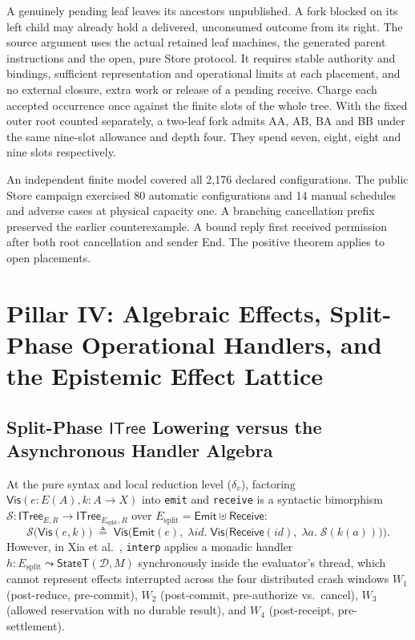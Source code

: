 \documentclass[11pt,a4paper]{article}
\theoremstyle{definition}
\theoremstyle{remark}
\newcommand{\ITree}{\mathsf{ITree}}
\begin{document}
A genuinely pending leaf leaves its ancestors unpublished. A fork blocked on its left child may already hold a delivered, unconsumed outcome from its right. The source argument uses the actual retained leaf machines, the generated parent instructions and the open, pure Store protocol. It requires stable authority and bindings, sufficient representation and operational limits at each placement, and no external closure, extra work or release of a pending receive. Charge each accepted occurrence once against the finite slots of the whole tree. With the fixed outer root counted separately, a two-leaf fork admits AA, AB, BA and BB under the same nine-slot allowance and depth four. They spend seven, eight, eight and nine slots respectively.

An independent finite model covered all 2,176 declared configurations. The public Store campaign exercised 80 automatic configurations and 14 manual schedules and adverse cases at physical capacity one. A branching cancellation prefix preserved the earlier counterexample. A bound reply first received permission after both root cancellation and sender End. The positive theorem applies to open placements.

\section{Pillar IV: Algebraic Effects, Split-Phase Operational Handlers, and the Epistemic Effect Lattice}

\subsection{Split-Phase \texorpdfstring{$\ITree$}{ITree} Lowering versus the Asynchronous Handler Algebra}
At the pure syntax and local reduction level ($\delta_v$), factoring $\mathsf{Vis}(e : E(A), k : A \to X)$ into \texttt{emit} and \texttt{receive} is a syntactic bimorphism $\mathcal{S} : \ITree_{E,R} \to \ITree_{E_{\text{split}}, R}$ over $E_{\text{split}} = \mathsf{Emit} \uplus \mathsf{Receive}$:
\[
  \mathcal{S}\big(\mathsf{Vis}(e, k)\big) \;\triangleq\; \mathsf{Vis}\Big(\mathsf{Emit}(e),\; \lambda \mathit{id}.\; \mathsf{Vis}\big(\mathsf{Receive}(\mathit{id}),\; \lambda a.\; \mathcal{S}(k(a))\big)\Big).
\]
However, in Xia et al.\ \cite{xia2020interaction}, \texttt{interp} applies a monadic handler $h : E_{\text{split}} \leadsto \mathsf{StateT}(\mathcal{D}, M)$ synchronously inside the evaluator's thread, which cannot represent effects interrupted across the four distributed crash windows $W_1$ (post-reduce, pre-commit), $W_2$ (post-commit, pre-authorize vs.\ cancel), $W_3$ (allowed reservation with no durable result), and $W_4$ (post-receipt, pre-settlement).
\end{document}
